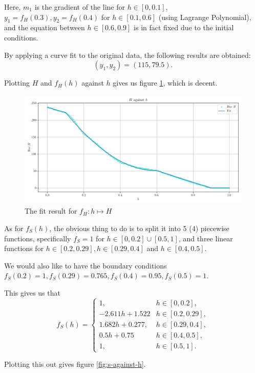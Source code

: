 \documentclass[10pt]{article}
\begin{document}
Here, \(m_1\) is the gradient of the line for \(h \in [0, 0.1]\), \(y_1 = f_H(0.3), y_2 = f_H(0.4)\) for \(h \in [0.1, 0.6]\) (using Lagrange Polynomial), and the equation between \(h \in [0.6, 0.9]\) is in fact fixed due to the initial conditions.

By applying a curve fit to the original data, the following results are obtained:
\[
    (y_1, y_2) = (115, 79.5).
\]

Plotting \(H\) and \(f_H(h)\) against \(h\) gives us figure \ref{fig:h-against-h}, which is decent.

\begin{figure}[!ht]
    \centering
    \includegraphics[scale = 0.55]{h-against-h.png}
    \caption{The fit result for \(f_H: h \mapsto H\)}
    \label{fig:h-against-h}
\end{figure}

As for \(f_S(h)\), the obvious thing to do is to split it into 5 (4) piecewise functions, specifically \(f_S = 1\) for \(h \in [0, 0.2] \cup [0.5, 1]\), and three linear functions for \(h \in [0.2, 0.29], h \in [0.29, 0.4]\) and \(h \in [0.4, 0.5]\).

We would also like to have the boundary conditions \(f_S(0.2) = 1, f_S(0.29) = 0.765, f_S(0.4) = 0.95, f_S(0.5) = 1\).

This gives us that
\[
    f_S(h) = \begin{cases}
        1,           & h \in [0, 0.2],   \\
        -2.611h + 1.522 & h \in [0.2, 0.29], \\
        1.682h + 0.277, & h \in [0.29, 0.4], \\
        0.5h + 0.75  & h \in [0.4, 0.5], \\
        1,           & h \in [0.5, 1].
    \end{cases}
\]

Plotting this out gives figure \ref{fig:s-against-h}.
\end{document}
